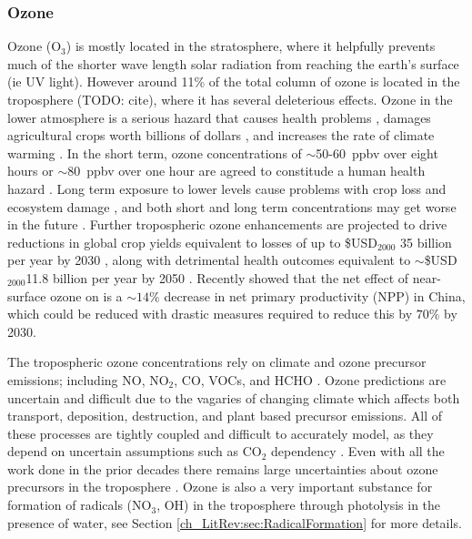     \subsubsection{Ozone}
      Ozone (O$_3$) is mostly located in the stratosphere, where it helpfully prevents much of the shorter wave length solar radiation from reaching the earth's surface (ie UV light).
      However around 11\% of the total column of ozone is located in the troposphere (TODO: cite), where it has several deleterious effects.
      Ozone in the lower atmosphere is a serious hazard that causes health problems \citep{Hsieh2013}, damages agricultural crops worth billions of dollars \citep{Avnery2011,Yue2017}, and increases the rate of climate warming \citep{IPCC_2013_chap8}.
      In the short term, ozone concentrations of $\sim$50-60~ppbv over eight hours or $\sim$80~ppbv over one hour are agreed to constitude a human health hazard \citep{Ayers2006,Lelieveld2009}. 
      Long term exposure to lower levels cause problems with crop loss and ecosystem damage \citep{Emberson2003}, and both short and long term concentrations may get worse in the future \citep{Lelieveld2009, Stevenson2013}.
      Further tropospheric ozone enhancements are projected to drive reductions in global crop yields equivalent to losses of up to \$USD$_{2000}$ 35 billion per year by 2030 \citep{Avnery2011}, along with detrimental health outcomes equivalent to $\sim$\$USD$_{2000}$11.8 billion per year by 2050 \citep{Selin2009}.
      Recently \cite{Yue2017} showed that the net effect of near-surface ozone on is a $\sim 14\%$ decrease in net primary productivity (NPP) in China, which could be reduced with drastic measures required to reduce this by $70\%$ by 2030.
      
      The tropospheric ozone concentrations rely on climate and ozone precursor emissions; including NO, NO$_2$, CO, VOCs, and HCHO \citep{Atkinson2000, Young2013, Marvin2017}. 
      Ozone predictions are uncertain and difficult due to the vagaries of changing climate which affects both transport, deposition, destruction, and plant based precursor emissions.
      All of these processes are tightly coupled and difficult to accurately model, as they depend on uncertain assumptions such as CO$_2$ dependency \citep{Young2013}.
      Even with all the work done in the prior decades there remains large uncertainties about ozone precursors in the troposphere \citep{Mazzuca2016}.
      Ozone is also a very important substance for formation of radicals (NO$_3$, OH) in the troposphere through photolysis in the presence of water, see Section \ref{ch_LitRev:sec:RadicalFormation} for more details.
    
